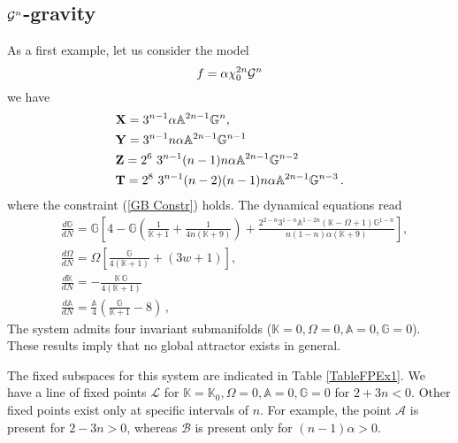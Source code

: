 \documentclass[a4paper,aps,onecolumn,nofootinbib]{revtex4}
\def\rf#1{(\ref{#1})}
\def\DerN#1{\frac{d #1}{d N}}
\begin{document}
\subsection{${\cal G}^n$-gravity}
As a first example, let us consider the model 
\begin{equation}
f= \alpha \chi_0^{2n} {\cal G}^n 
\end{equation}
 we have 
 \begin{align} \label{XYT}
& {\bf X}= 3^{n-1} \alpha  \mathbb{A}^{2 n-1} \mathbb{G}^n ,\\
&  {\bf Y}=3^{n-1} n \alpha  \mathbb{A}^{2 n-1} \mathbb{G}^{n-1}\\
& {\bf Z}=2^6\ 3^{n-1} (n-1) n \alpha  \mathbb{A}^{2n-1} \mathbb{G}^{n-2}\\
&  {\bf T}= 2^8\ 3^{n-1} (n-2) (n-1) n \alpha  \mathbb{A}^{2 n-1} \mathbb{G}^{n-3}\,.
\end{align}
where the constraint  \rf{GB Constr} holds. The dynamical equations read
\begin{equation}\label{DynSysEx1}
\begin{split}
&\DerN{\mathbb{G}}= \mathbb{G} \left[4-\mathbb{G}\left(\frac{1 }{\mathbb{K}+1}+\frac{1}{4n(\mathbb{K}+9) } \right)+\frac{2^{2-n}
   3^{1-n} \mathbb{A}^{1-2 n} (\mathbb{K}-\Omega +1) \mathbb{G}^{1-n}}{n(1-n) \alpha (\mathbb{K}+9)
   }\right],\\ 
&\DerN{\Omega} =\Omega  \left[\frac{\mathbb{G}}{4 (\mathbb{K}+1)}+(3 w+1)\right],\\ 
&\DerN{\mathbb{K} }=-\frac{\mathbb{K}\, \mathbb{G} }{4(
   \mathbb{K}+1)}\\
&\DerN{\mathbb{A}}=\frac{\mathbb{A}}{4}  \left(\frac{\mathbb{G}}{\mathbb{K}+1}-8\right)\,,
\end{split}
\end{equation}
The system admits four invariant submanifolds ($\mathbb{K}=0, \Omega=0,\mathbb{A}=0, \mathbb{G}=0$). These results imply that no global attractor exists in general.

The fixed subspaces for this system are indicated in Table \ref{TableFPEx1}. We have a line of fixed points $\mathcal{L}$ for $\mathbb{K}=\mathbb{K}_0, \Omega=0,\mathbb{A}=0, \mathbb{G}=0$  for $2+3n<0$. Other fixed points exist only 
at specific intervals of $n$. For example, the point  $\mathcal{A}$  is present for $2-3n>0$, whereas $\mathcal{B}$ is present only for  $(n-1)\alpha>0$.
\end{document}
